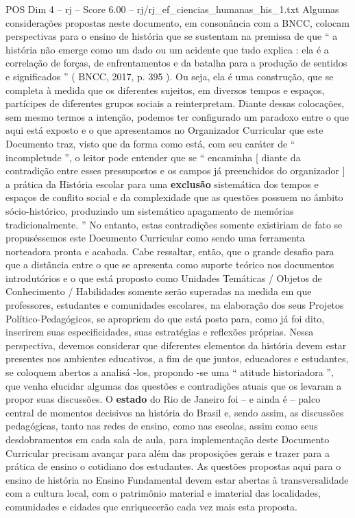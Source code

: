 \begin{textsample}{POS Dim 4 – rj – Score 6.00 – rj/rj\_ef\_ciencias\_humanas\_his\_1.txt}
Algumas considerações propostas neste documento, em consonância com a BNCC, colocam perspectivas para o ensino de história que se sustentam na premissa de que “ a história não emerge como um dado ou um acidente que tudo explica : ela é a correlação de forças, de enfrentamentos e da batalha para a produção de sentidos e significados ” ( BNCC, 2017, p. 395 ).
Ou seja, ela é uma construção, que se completa à medida que os diferentes sujeitos, em diversos tempos e espaços, partícipes de diferentes grupos sociais a reinterpretam.
Diante dessas colocações, sem mesmo termos a intenção, podemos ter configurado um paradoxo entre o que aqui está exposto e o que apresentamos no Organizador Curricular que este Documento traz, visto que da forma como está, com seu caráter de “ incompletude ”, o leitor pode entender que se “ encaminha [ diante da contradição entre esses pressupostos e os campos já preenchidos do organizador ] a prática da História escolar para uma \textbf{exclusão} sistemática dos tempos e espaços de conflito social e da complexidade que as questões possuem no âmbito sócio-histórico, produzindo um sistemático apagamento de memórias tradicionalmente. ” No entanto, estas contradições somente existiriam de fato se propuséssemos este Documento Curricular como sendo uma ferramenta norteadora pronta e acabada.
Cabe ressaltar, então, que o grande desafio para que a distância entre o que se apresenta como suporte teórico nos documentos introdutórios e o que está proposto como Unidades Temáticas / Objetos de Conhecimento / Habilidades somente serão superadas na medida em que professores, estudantes e comunidades escolares, na elaboração dos seus Projetos Político-Pedagógicos, se apropriem do que está posto para, como já foi dito, inserirem suas especificidades, suas estratégias e reflexões próprias.
Nessa perspectiva, devemos considerar que diferentes elementos da história devem estar presentes nos ambientes educativos, a fim de que juntos, educadores e estudantes, se coloquem abertos a analisá -los, propondo -se uma “ atitude historiadora ”, que venha elucidar algumas das questões e contradições atuais que os levaram a propor suas discussões.
O \textbf{estado} do Rio de Janeiro foi – e ainda é – palco central de momentos decisivos na história do Brasil e, sendo assim, as discussões pedagógicas, tanto nas redes de ensino, como nas escolas, assim como seus desdobramentos em cada sala de aula, para implementação deste Documento Curricular precisam avançar para além das proposições gerais e trazer para a prática de ensino o cotidiano dos estudantes.
As questões propostas aqui para o ensino de história no Ensino Fundamental devem estar abertas à transversalidade com a cultura local, com o patrimônio material e imaterial das localidades, comunidades e cidades que enriquecerão cada vez mais esta proposta.

\end{textsample}
